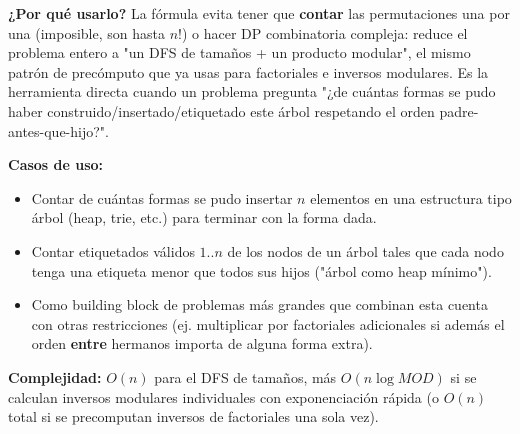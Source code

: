 \documentclass[10pt,a4paper,twocolumn]{article}
\begin{document}
\textbf{¿Por qué usarlo?} La fórmula evita tener que \textbf{contar}
las permutaciones una por una (imposible, son hasta $n!$) o hacer DP
combinatoria compleja: reduce el problema entero a "un DFS de
tamaños + un producto modular", el mismo patrón de precómputo que ya
usas para factoriales e inversos modulares. Es la herramienta directa
cuando un problema pregunta "¿de cuántas formas se pudo haber
construido/insertado/etiquetado este árbol respetando el orden
padre-antes-que-hijo?".

\textbf{Casos de uso:}

\begin{itemize}
	\item Contar de cuántas formas se pudo insertar $n$ elementos en
	una estructura tipo árbol (heap, trie, etc.) para terminar con la
	forma dada.
	\item Contar etiquetados válidos $1..n$ de los nodos de un árbol
	tales que cada nodo tenga una etiqueta menor que todos sus hijos
	("árbol como heap mínimo").
	\item Como building block de problemas más grandes que combinan
	esta cuenta con otras restricciones (ej. multiplicar por
	factoriales adicionales si además el orden \textbf{entre}
	hermanos importa de alguna forma extra).
\end{itemize}

\textbf{Complejidad:} $O(n)$ para el DFS de tamaños, más
$O(n \log MOD)$ si se calculan inversos modulares individuales con
exponenciación rápida (o $O(n)$ total si se precomputan inversos de
factoriales una sola vez).
\end{document}
